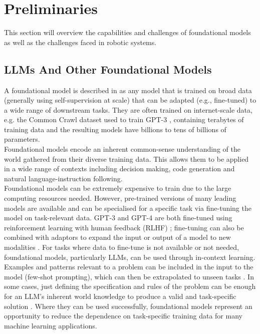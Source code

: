 \section{Preliminaries}
This section will overview the capabilities and challenges of foundational models as well as the challenges faced in robotic systems.

\subsection{LLMs And Other Foundational Models}
A foundational model is described in \cite{DBLP:journals/corr/abs-2108-07258} as any model that is trained on broad data (generally using self-supervision at scale) that can be adapted (e.g., fine-tuned) to a wide range of downstream tasks. They are often trained on internet-scale data, e.g. the Common Crawl dataset used to train GPT-3 \cite{DBLP:journals/corr/abs-2005-14165}, containing terabytes of training data and the resulting models have billions to tens of billions of parameters.
\\
Foundational models encode an inherent common-sense understanding of the world gathered from their diverse training data. This allows them to be applied in a wide range of contexts including decision making, code generation and natural language-instruction following. %
\\
Foundational models can be extremely expensive to train due to the large computing resources needed. However, pre-trained versions of many leading models are available and can be specialised for a specific task via fine-tuning the model on task-relevant data. GPT-3 and GPT-4 are both fine-tuned using reinforcement learning with human feedback (RLHF) \cite{openai2023gpt4}; fine-tuning can also be combined with adaptors to expand the input or output of a model to new modalities \cite{zhang2023motiongpt}. For tasks where data to fine-tune is not available or not needed, foundational models, particularly LLMs, can be used through in-context learning. Examples and patterns relevant to a problem can be included in the input to the model (few-shot prompting), which can then be extrapolated to unseen tasks \cite{DBLP:journals/corr/abs-2005-14165}. In some cases, just defining the specification and rules of the problem can be enough for an LLM's inherent world knowledge to produce a valid and task-specific solution \cite{DBLP:journals/corr/abs-2201-07207}. Where they can be used successfully, foundational models represent an opportunity to reduce the dependence on task-specific training data for many machine learning applications. %
